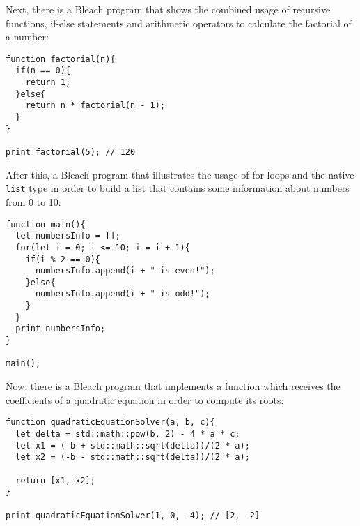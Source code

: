 Next, there is a Bleach program that shows the combined usage of recursive functions, if-else statements and arithmetic operators to calculate the factorial of a number: \newline
\begin{lstlisting}
function factorial(n){
  if(n == 0){
    return 1;
  }else{
    return n * factorial(n - 1);
  }
}

print factorial(5); // 120
\end{lstlisting}


After this, a Bleach program that illustrates the usage of for loops and the native \texttt{list} type in order to build a list that contains some information about numbers from 0 to 10: \newline
\begin{lstlisting}
function main(){
  let numbersInfo = [];
  for(let i = 0; i <= 10; i = i + 1){
    if(i % 2 == 0){
      numbersInfo.append(i + " is even!");
    }else{
      numbersInfo.append(i + " is odd!");
    }
  }
  print numbersInfo;
}

main();
\end{lstlisting}

\newpage


Now, there is a Bleach program that implements a function which receives the coefficients of a quadratic equation in order to compute its roots: \newline
\begin{lstlisting}
function quadraticEquationSolver(a, b, c){
  let delta = std::math::pow(b, 2) - 4 * a * c;
  let x1 = (-b + std::math::sqrt(delta))/(2 * a);
  let x2 = (-b - std::math::sqrt(delta))/(2 * a);

  return [x1, x2];
}

print quadraticEquationSolver(1, 0, -4); // [2, -2]
\end{lstlisting}


